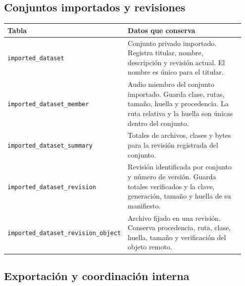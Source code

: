 \subsection*{Conjuntos importados y revisiones}

\noindent
\begin{tabular}{@{}p{0.40\linewidth}p{0.55\linewidth}@{}}
\hline
\textbf{Tabla} & \textbf{Datos que conserva} \\
\hline
\texttt{imported\_\allowbreak{}dataset} & Conjunto privado importado. Registra titular, nombre, descripción y revisión actual. El nombre es único para el titular. \\
\texttt{imported\_\allowbreak{}dataset\_\allowbreak{}member} & Audio miembro del conjunto importado. Guarda clase, rutas, tamaño, huella y procedencia. La ruta relativa y la huella son únicas dentro del conjunto. \\
\texttt{imported\_\allowbreak{}dataset\_\allowbreak{}summary} & Totales de archivos, clases y bytes para la revisión registrada del conjunto. \\
\texttt{imported\_\allowbreak{}dataset\_\allowbreak{}revision} & Revisión identificada por conjunto y número de versión. Guarda totales verificados y la clave, generación, tamaño y huella de su manifiesto. \\
\texttt{imported\_\allowbreak{}dataset\_\allowbreak{}revision\_\allowbreak{}object} & Archivo fijado en una revisión. Conserva procedencia, ruta, clase, huella, tamaño y verificación del objeto remoto. \\
\hline
\end{tabular}

\subsection*{Exportación y coordinación interna}

